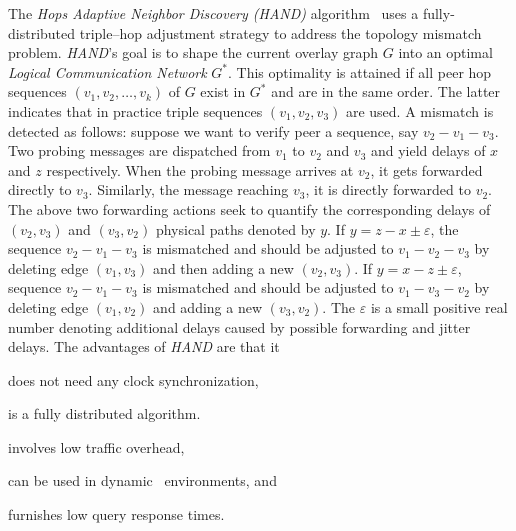 The \emph{Hops Adaptive Neighbor Discovery (HAND)} algorithm~\cite{CLZHC2006}
uses a fully-distributed triple--hop adjustment strategy
to address the topology mismatch problem.
\emph{HAND}'s goal is to shape the current overlay
graph $G$ into an optimal \emph{Logical Communication Network} 
$G^{*}$.
This optimality is attained if all peer hop 
sequences $(v_1, v_2, \ldots, v_k)$ of $G$ exist in $G^{*}$ 
and are in the same order.
The latter indicates that in 
practice triple sequences $(v_1, v_2, v_3)$ are used.
A mismatch is detected as follows:
suppose we want to verify peer a
sequence, say $v_2-v_1-v_3$. 
Two probing messages are dispatched from $v_1$ to
$v_2$ and $v_3$ and yield delays of $x$ and $z$ respectively.
%
When the probing message arrives at $v_2$, it gets forwarded
directly to $v_3$. 
Similarly, the message reaching $v_3$, it is directly forwarded to $v_2$.
The above two forwarding actions seek to quantify 
the corresponding delays of $(v_2,v_3)$ and $(v_3,v_2)$ physical paths
denoted by $y$. 
If $y=z-x\pm\varepsilon$, the sequence $v_2-v_1-v_3$ is mismatched and should
be adjusted to $v_1-v_2-v_3$ by deleting edge $(v_1,v_3)$ and 
then adding a new $(v_2,v_3)$. 
If $y=x-z\pm\varepsilon$, sequence $v_2-v_1-v_3$ is mismatched and
should be adjusted to $v_1-v_3-v_2$ by deleting edge $(v_1,v_2)$ and adding a
new $(v_3,v_2)$. 
The  $\varepsilon$ is a small positive real number denoting
additional delays caused by possible forwarding and jitter delays. 
The advantages of \emph{HAND} are that it
\begin{inparaenum}
  \item does not need any clock synchronization,
  \item is a fully distributed algorithm.
  \item involves low traffic overhead,
  \item can be used in dynamic \p\ environments, and 
  \item furnishes low query response times.
\end{inparaenum}
